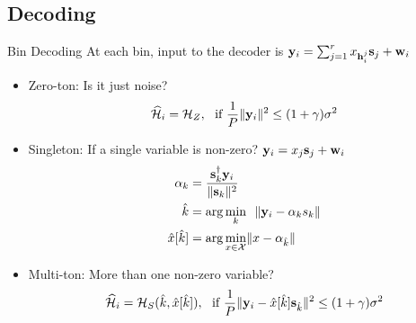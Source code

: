 \documentclass[10pt]{beamer}
\begin{document}
\subsection{Decoding}
\begin{frame}{Bin Decoding}
At each bin, input to the decoder is $\mathbf{y}_i=\sum_{j=1}^{r}x_{\mathbf{h}_{i}^{j}}\mathbf{s}_j+\mathbf{w}_i$
\begin{itemize}
\item Zero-ton: Is it just noise?
\begin{equation*}
\widehat{\mathcal{H}}_i=\mathcal{H}_{Z}, ~~\text{if } \frac{1}{P}\lVert{\mathbf{y}_i}\rVert^2\leq (1+\gamma)\sigma^2
\end{equation*}
\item Singleton: If a single variable is non-zero? $\mathbf{y}_i=x_j\mathbf{s}_j+\mathbf{w}_i$
\begin{align*}
\alpha_{k}&=\frac{\mathbf{s}_k^{\dagger}\mathbf{y}_i}{\lVert{\mathbf{s}_k}\rVert^2}\\
\hat{k}&=\arg \min_{k}~~ \lVert{\mathbf{y}_i-\alpha_{k}s_k}\rVert\\
\hat{x}[\hat{k}]&=\arg \min_{x\in\mathcal{X}} \lVert{x-\alpha_{\hat{k}}}\rVert
\end{align*}
\item Multi-ton: More than one non-zero variable?
\begin{equation*}
\widehat{\mathcal{H}}_i=\mathcal{H}_{S}(\hat{k},\hat{x}[\hat{k}]), ~~\text{if } \frac{1}{P}\lVert{\mathbf{y}_{i}-\hat{x}[\hat{k}]\mathbf{s}_{\hat{k}}}\rVert^2\leq (1+\gamma)\sigma^2
\end{equation*}
\end{itemize}
\end{frame}
\end{document}
